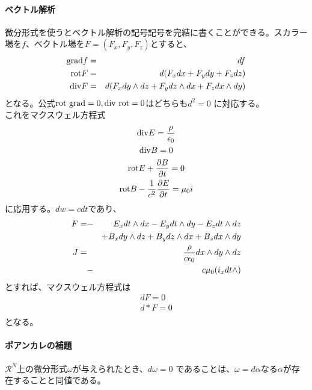         \paragraph{ベクトル解析}
            微分形式を使うとベクトル解析の記号記号を完結に書くことができる。スカラー
            場を$f$、ベクトル場を$F = (F_x,F_y,F_z)$とすると、
            \begin{eqnarray*}
                {\rm grad}f &=& df\\
                {\rm rot}F &=& d(F_xdx+F_ydy+F_zdz)\\
                {\rm div}F &=& d(F_xdy\we dz+F_ydz\we dx+F_zdx\we dy)
            \end{eqnarray*}
            となる。公式${\rm rot\ grad}=0,{\rm div\ rot}=0$はどちらも$d^2=0$
            に対応する。\\
            これをマクスウェル方程式
            \begin{gather*}
                {\rm div}E = \frac{\rho}{\epsilon_0}\\
                {\rm div}B = 0\\
                {\rm rot}E+\pd[B]{t} = 0\\
                {\rm rot}B-\rec{c^2}\pd[E]{t} = \mu_0 i
            \end{gather*}
            に応用する。$dw = cdt$であり、
            \begin{eqnarray*}
                F = &-&E_xdt\we dx-E_ydt\we dy-E_zdt\we dz\\
                    & &+B_xdy\we dz+B_ydz\we dx+B_zdx\we dy\\
                J = & &\frac{\rho}{c\epsilon_0}dx\we dy\we dz\\
                    &-&c\mu_0(i_xdt\we)
            \end{eqnarray*}
            とすれば、マクスウェル方程式は
            \begin{eqnarray*}
                dF = 0\\
                d*F = 0\\
            \end{eqnarray*}
            となる。
        \paragraph{ポアンカレの補題}
            $\mathcal{R}^N$上の微分形式$\omega$が与えられたとき、$d\omega = 0$
            であることは、$\omega = d\alpha$なる$\alpha$が存在することと同値である。


